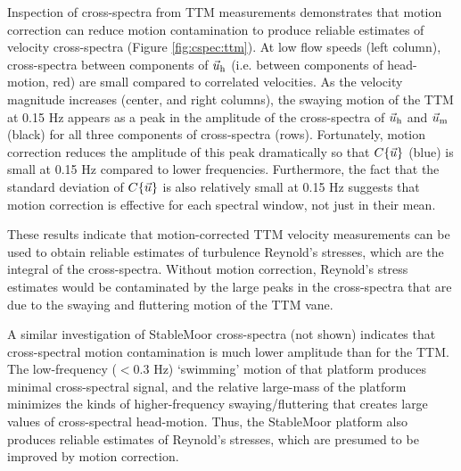 Inspection of cross-spectra from TTM measurements demonstrates that motion correction can reduce motion contamination to produce reliable estimates of velocity cross-spectra (Figure \ref{fig:cspec:ttm}). At low flow speeds (left column), cross-spectra between components of $\vec{u}_\mathrm{h}$ (i.e. between components of head-motion, red) are small compared to correlated velocities. As the velocity magnitude increases (center, and right columns), the swaying motion of the TTM at 0.15 Hz appears as a peak in the amplitude of the cross-spectra of $\vec{u}_\mathrm{h}$ and $\vec{u}_\mathrm{m}$ (black) for all three components of cross-spectra (rows). Fortunately, motion correction reduces the amplitude of this peak dramatically so that $C\{\vec{u}\}$ (blue) is small at 0.15 Hz compared to lower frequencies. Furthermore, the fact that the standard deviation of $C\{\vec{u}\}$ is also relatively small at 0.15 Hz suggests that motion correction is effective for each spectral window, not just in their mean.

These results indicate that motion-corrected TTM velocity measurements can be used to obtain reliable estimates of turbulence Reynold's stresses, which are the integral of the cross-spectra. Without motion correction, Reynold's stress estimates would be contaminated by the large peaks in the cross-spectra that are due to the swaying and fluttering motion of the TTM vane.

A similar investigation of StableMoor cross-spectra (not shown) indicates that cross-spectral motion contamination is much lower amplitude than for the TTM. The low-frequency ($<0.3$ Hz) `swimming' motion of that platform produces minimal cross-spectral signal, and the relative large-mass of the platform minimizes the kinds of higher-frequency swaying/fluttering that creates large values of cross-spectral head-motion. Thus, the StableMoor platform also produces reliable estimates of Reynold's stresses, which are presumed to be improved by motion correction.





